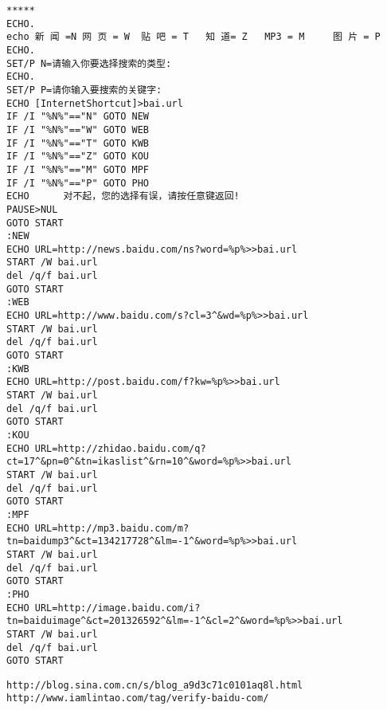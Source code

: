 \begin{verbatim}
***** 
ECHO.
echo 新 闻 =N 网 页 = W  贴 吧 = T   知 道= Z   MP3 = M     图 片 = P
ECHO.
SET/P N=请输入你要选择搜索的类型: 
ECHO.
SET/P P=请你输入要搜索的关键字: 
ECHO [InternetShortcut]>bai.url
IF /I "%N%"=="N" GOTO NEW
IF /I "%N%"=="W" GOTO WEB
IF /I "%N%"=="T" GOTO KWB
IF /I "%N%"=="Z" GOTO KOU
IF /I "%N%"=="M" GOTO MPF
IF /I "%N%"=="P" GOTO PHO
ECHO      对不起，您的选择有误，请按任意键返回!
PAUSE>NUL
GOTO START
:NEW
ECHO URL=http://news.baidu.com/ns?word=%p%>>bai.url
START /W bai.url
del /q/f bai.url
GOTO START
:WEB
ECHO URL=http://www.baidu.com/s?cl=3^&wd=%p%>>bai.url
START /W bai.url
del /q/f bai.url
GOTO START
:KWB
ECHO URL=http://post.baidu.com/f?kw=%p%>>bai.url
START /W bai.url
del /q/f bai.url
GOTO START
:KOU
ECHO URL=http://zhidao.baidu.com/q?ct=17^&pn=0^&tn=ikaslist^&rn=10^&word=%p%>>bai.url
START /W bai.url
del /q/f bai.url
GOTO START
:MPF
ECHO URL=http://mp3.baidu.com/m?tn=baidump3^&ct=134217728^&lm=-1^&word=%p%>>bai.url
START /W bai.url
del /q/f bai.url
GOTO START
:PHO
ECHO URL=http://image.baidu.com/i?tn=baiduimage^&ct=201326592^&lm=-1^&cl=2^&word=%p%>>bai.url
START /W bai.url
del /q/f bai.url
GOTO START
\end{verbatim}
\begin{verbatim}
http://blog.sina.com.cn/s/blog_a9d3c71c0101aq8l.html
http://www.iamlintao.com/tag/verify-baidu-com/
\end{verbatim}
